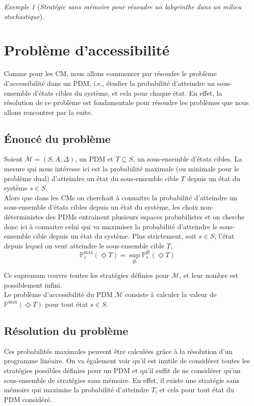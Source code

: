 \documentclass[12pt,a4paper]{report}
\theoremstyle{definition}%
\theoremstyle{remark}
\newtheorem{example}{Exemple}[chapter]
\newcommand{\pr}{\mathbb{P}}
\begin{document}
\begin{example}[\textit{Stratégie sans mémoire pour résoudre un labyrinthe
dans un milieu stochastique}]
\end{example}

\section{Problème d'accessibilité}
Comme pour les CM, nous allons commencer par résoudre le problème d'accessibilité
dans un PDM, i.e., étudier la probabilité d'atteindre un sous-ensemble d'états cibles
du système, et cela pour chaque état. En effet, la résolution de ce problème est
fondamentale pour résoudre les problèmes que nous allons rencontrer par la suite.

\subsection{\'Enoncé du problème}
Soient $\mathcal{M} = (S, A, \Delta)$, un PDM et $T \subseteq S$, un sous-ensemble
d'états cibles. La mesure qui nous intéresse ici est la probabilité maximale
(ou minimale pour le problème dual) d'atteindre un état du sous-ensemble cible $T$
depuis un état du système $s \in S$. \\

Alors que dans les CMs on cherchait à connaitre la probabilité d'atteindre un
sous-ensemble d'états cibles depuis un état du système, les choix non-déterministes des PDMs entrainent
plusieurs espaces probabilistes et on cherche donc ici à connaitre celui qui va maximiser
la probabilité d'atteindre le sous-ensemble cible depuis un état du système.
Plus strictement, soit $s \in S$, l'état depuis lequel on veut atteindre le
sous-ensemble cible $T$,
\[
	\pr^{\max}_s(\Diamond T) = \sup_\mathfrak{S} \pr^\mathfrak{S}_s(\Diamond T)
\]

Ce supremum couvre toutes les stratégies définies pour $\mathcal{M}$, et leur nombre
est possiblement infini. \\

Le problème d'accessibilité du PDM $\mathcal{M}$ consiste à calculer la valeur de
$\pr^{\max}(\Diamond T)$ pour tout état $s \in S$.

\subsection{Résolution du problème}
Ces probabilités maximales peuvent être calculées grâce à la résolution
d'un programme linéaire. On va également voir qu'il est inutile de considérer toutes
les stratégies possibles définies pour un PDM et qu'il suffit de ne considérer
qu'un sous-ensemble de stratégies sans mémoire. En effet, il existe une stratégie
sans mémoire qui maximise la probabilité d'atteindre $T$, et cela pour tout état
du PDM considéré.
\end{document}
